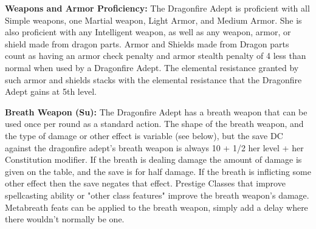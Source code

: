 \begin{extraclasstable}{}
\end{extraclasstable}

\classfeatures

\textbf{Weapons and Armor Proficiency:} The Dragonfire Adept is proficient with all Simple weapons, one Martial weapon, Light Armor, and Medium Armor. She is also proficient with any Intelligent weapon, as well as any weapon, armor, or shield made from dragon parts. Armor and Shields made from Dragon parts count as having an armor check penalty and armor stealth penalty of 4 less than normal when used by a Dragonfire Adept. The elemental resistance granted by such armor and shields stacks with the elemental resistance that the Dragonfire Adept gains at 5th level.

\textbf{Breath Weapon (Su):} The Dragonfire Adept has a breath weapon that can be used once per round as a standard action. The shape of the breath weapon, and the type of damage or other effect is variable (see below), but the save DC against the dragonfire adept's breath weapon is always 10 + 1/2 her level + her Constitution modifier. If the breath is dealing damage the amount of damage is given on the table, and the save is for half damage. If the breath is inflicting some other effect then the save negates that effect. Prestige Classes that improve spellcasting ability or "other class features" improve the breath weapon's damage. Metabreath feats can be applied to the breath weapon, simply add a delay where there wouldn't normally be one.

